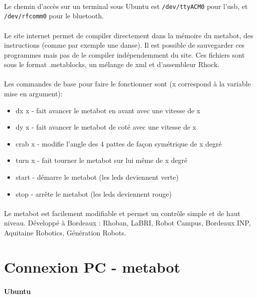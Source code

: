 \documentclass[10pt,a4paper]{report}
\begin{document}
\paragraph{}
Le chemin d'accès sur un terminal sous Ubuntu est \texttt{/dev/ttyACM0} pour l'usb, et \texttt{/dev/rfcomm0} pour le bluetooth. 

\paragraph{}
Le site internet permet de compiler directement dans la mémoire du metabot, des instructions (comme par exemple une danse). Il est possible de sauvegarder ces programmes mais pas de le compiler indépendemment du site. Ces fichiers sont sous le format .metablocks, un mélange de xml et d'assembleur Rhock.
\paragraph{}
Les commandes de base pour faire le fonctionner sont (x correspond à la variable mise en argument):\\
\begin{itemize}
\item dx x - fait avancer le metabot en avant avec une vitesse de x
\item dy x - fait avancer le metabot de coté avec une vitesse de x
\item crab x - modifie l'angle des 4 pattes de façon symétrique de x degré
\item turn x - fait tourner le metabot sur lui même de x degré
\item start - démarre le metabot (les  leds deviennent verte)
\item stop - arrête le metabot (les  leds deviennent rouge)
\end{itemize}
\paragraph{}
Le metabot est facilement modifiable et permet un contrôle simple et de haut niveau.
Développé à Bordeaux : Rhoban, LaBRI, Robot Campus, Bordeaux INP, Aquitaine Robotics, Génération Robots.

\section{Connexion PC - metabot}

\paragraph{Ubuntu}
\end{document}
